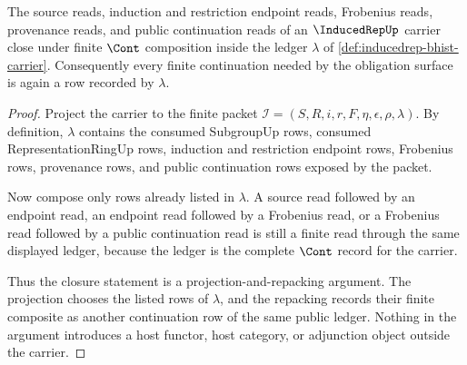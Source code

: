 \begin{theorem}
\label{thm:inducedrep-cont-ledger-closure}
The source reads, induction and restriction endpoint reads, Frobenius reads,
provenance reads, and public continuation reads of an $\InducedRepUp$
carrier close under finite $\Cont$ composition inside the ledger
$\lambda$ of \autoref{def:inducedrep-bhist-carrier}. Consequently every
finite continuation needed by the obligation surface is again a row recorded
by $\lambda$.
\end{theorem}
\begin{proof}
Project the carrier to the finite packet
$\mathcal{I}=(S,R,i,r,F,\eta,\epsilon,\rho,\lambda)$. By definition,
$\lambda$ contains the consumed SubgroupUp rows, consumed
RepresentationRingUp rows, induction and restriction endpoint rows,
Frobenius rows, provenance rows, and public continuation rows exposed by the
packet.

Now compose only rows already listed in $\lambda$. A source read followed by
an endpoint read, an endpoint read followed by a Frobenius read, or a
Frobenius read followed by a public continuation read is still a finite
read through the same displayed ledger, because the ledger is the complete
$\Cont$ record for the carrier.

Thus the closure statement is a projection-and-repacking argument. The
projection chooses the listed rows of $\lambda$, and the repacking records
their finite composite as another continuation row of the same public
ledger. Nothing in the argument introduces a host functor, host category,
or adjunction object outside the carrier.
\end{proof}

